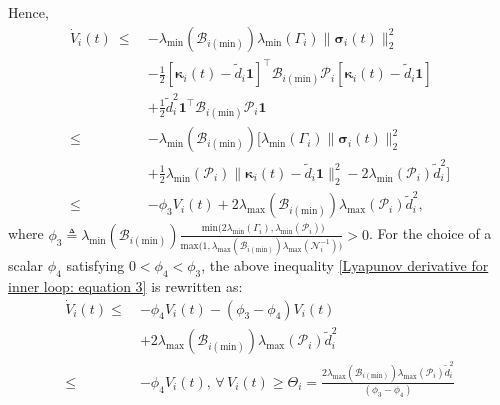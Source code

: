\documentclass[lettersize,journal]{IEEEtran}
\begin{document}
Hence,
\begin{align}
\label{Lyapunov derivative for inner loop: equation 3}
\dot{V}_i(t) ~ \leq ~ &-\lambda_{\text{min}}(\mathcal{B}_{i(\text{min})})\lambda_{\text{min}}(\Gamma_i) \lVert \boldsymbol{\sigma}_i(t) \rVert_2^2 \nonumber\\
& - \frac{1}{2}\left[\boldsymbol{\kappa}_i(t) - \tilde{d}_{i} \boldsymbol{1}\right]^{\top} \mathcal{B}_{i (\text{min})} \mathcal{P}_{i} \left[\boldsymbol{\kappa}_i(t) - \tilde{d}_{i} \boldsymbol{1}\right] \nonumber\\
& +\frac{1}{2}\tilde{d}_{i}^2 \boldsymbol{1}^{\top} \mathcal{B}_{i (\text{min})} \mathcal{P}_{i} \boldsymbol{1} \nonumber \\
\leq ~ &-\lambda_{\text{min}}(\mathcal{B}_{i(\text{min})}) \Big[ \lambda_{\text{min}}(\Gamma_i) \lVert \boldsymbol{\sigma}_i(t) \rVert_2^2 \nonumber\\
& + \frac{1}{2}\lambda_{\text{min}}(\mathcal{P}_{i}) \lVert \boldsymbol{\kappa}_i(t) - \tilde{d}_{i} \boldsymbol{1} \rVert_2^2  - 2 \lambda_{\text{min}}(\mathcal{P}_{i}) \tilde{d}_{i}^2 \Big] \nonumber \\
\leq~ &-\phi_3 V_i(t) + 2 \lambda_{\text{max}}(\mathcal{B}_{i(\text{min})}) \lambda_{\text{max}}(\mathcal{P}_{i}) \tilde{d}_{i}^2,
\end{align}
where $\phi_3 \triangleq \lambda_{\text{min}}\left(\mathcal{B}_{i(\text{min})} \right) \frac{\text{ min}\big(2 \lambda_{\text{min}}\left(\Gamma_i \right),\lambda_{\text{min}}\left(\mathcal{P}_i \right)\big)}{\text{max}\big(1,\lambda_{\text{max}}\left(\mathcal{B}_{i(\text{min})} \right) \lambda_{\text{max}}\left(\mathcal{N}_i^{-1} \right)\big)}>0$.
For the choice of a scalar $\phi_4$ satisfying $0<\phi_4<\phi_3$, the above inequality \eqref{Lyapunov derivative for inner loop: equation 3} is rewritten as:
\begin{align}
\label{Lyapunov derivative for inner loop: equation 4}
\dot{V}_i(t)\leq~&-\phi_4 V_i(t)-(\phi_3-\phi_4) V_i(t) \nonumber \\
& + 2 \lambda_{\text{max}}(\mathcal{B}_{i(\text{min})}) \lambda_{\text{max}}(\mathcal{P}_{i}) \tilde{d}_{i}^2 \nonumber\\
\leq ~&-\phi_4 V_i(t), \, \forall\, V_i(t)\geq \Theta_i=\frac{2 \lambda_{\text{max}}(\mathcal{B}_{i(\text{min})}) \lambda_{\text{max}}(\mathcal{P}_{i}) \tilde{d}_{i}^2}{(\phi_3-\phi_4)}
\end{align}
\end{document}
